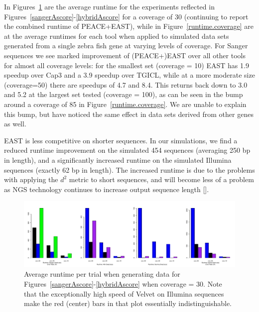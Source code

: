 \documentclass{bioinfo}
\newcommand{\peace} {{\small PEACE}}
\newcommand{\capthree} {{\small Cap3}}
\newcommand{\tgicl} {{\small TGICL}}
\newcommand{\east} {{\small EAST}}
\newcommand{\velvet}{{\small Velvet}}
\begin{document}
\vspace{3mm}

 In Figures~\ref{runtime.fixed} are
the average runtime for the experiments reflected in
Figures~\ref{sangerAscore}-\ref{hybridAscore} for a coverage of 30
(continuing to report the combined runtime of \peace+\east), while in
Figure~\ref{runtime.coverage} are at the average runtimes for each
tool when applied to simulated data sets generated from a single zebra
fish gene at varying levels of coverage.  For Sanger sequences we
see marked improvement of (\peace+)\east\/ over all other tools for
almost all coverage levels: for the smallest set (coverage = 10)
\east\/ has 1.9 speedup over \capthree\/ and a 3.9 speedup over
\tgicl, while at a more moderate size (coverage=50) there are speedups of
4.7 and 8.4.  This returns back down to 3.0 and 5.2 at the largest set
tested (coverage = 100), as can be seen in the bump around a coverage
of 85 in Figure~\ref{runtime.coverage}.  We are unable to
explain this bump, but have noticed the same effect in
data sets derived from other genes as well.


\east\/ is less competitive on shorter sequences.  In our simulations,
we find a reduced runtime improvement on the simulated 454 sequences
(averaging 250 bp in length), and a significantly increased runtime on
the simulated Illumina sequences (exactly 62 bp in length).  The
increased runtime is due to the problems with applying the $d^2$
metric to short sequences, and will become less of a problem as NGS
technology continues to increase output sequence length
[\cite{Eid09,Li10}]. 



\begin{figure}[htb]
\centerline{\includegraphics[width=6in]{pics.d/runtime_fixedsize_sanger.pdf}}
\caption{Average runtime per trial when generating data for
  Figures~\ref{sangerAscore}-\ref{hybridAscore}  when coverage = 30.
  Note that the exceptionally high speed of \velvet\/ on Illumina sequences make the
  red (center) bars in that plot essentially indistinguishable.}
\label{runtime.fixed}
\end{figure}
\end{document}

